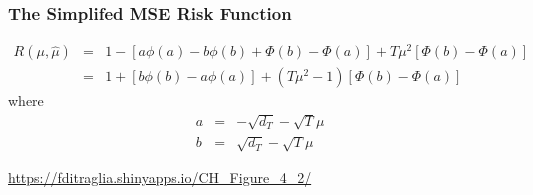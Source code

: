%
%
%
%
%
%
%
%
\begin{frame}
  \frametitle{The Simplifed MSE Risk Function}
	\begin{eqnarray*}
    R(\mu,\widehat{\mu}) &=& 1 - \left[a\phi(a) - b\phi(b) + \Phi(b) - \Phi(a) \right] + T\mu^2 \left[\Phi(b) - \Phi(a) \right]\\
		&=&1 + \left[b\phi(b) - a\phi(a)\right]  + (T\mu^2 - 1) \left[\Phi(b) - \Phi(a) \right] 
	\end{eqnarray*}
where
	\begin{eqnarray*}
		a &=& -\sqrt{d_T} - \sqrt{T}\mu\\
		b &=& \sqrt{d_T} - \sqrt{T}\mu
	\end{eqnarray*}

\url{https://fditraglia.shinyapps.io/CH\_Figure\_4\_2/}
\end{frame}
